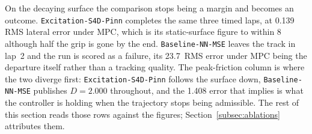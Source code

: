 \documentclass[lineno,12pt]{sn-jnl}
\makeatletter
\newif\ifsiu@prev
\DeclareRobustCommand{\siu@sep}{\ifsiu@prev\,\fi}
\DeclareRobustCommand{\siu@unit}[1]{\siu@sep\text{#1}\siu@prevtrue}
\DeclareRobustCommand{\siu@pre}[1]{\siu@sep\text{#1}\siu@prevfalse}
\DeclareRobustCommand{\siu@div}[1]{\text{#1}\siu@prevfalse}
\DeclareRobustCommand{\meter}{m}
\DeclareRobustCommand{\second}{s}
\DeclareRobustCommand{\gram}{g}
\DeclareRobustCommand{\newton}{N}
\DeclareRobustCommand{\radian}{rad}
\DeclareRobustCommand{\hertz}{Hz}
\DeclareRobustCommand{\percent}{\%}
\DeclareRobustCommand{\g}{\textit{g}}
\DeclareRobustCommand{\kilo}{k}
\DeclareRobustCommand{\milli}{m}
\DeclareRobustCommand{\per}{/}
\DeclareRobustCommand{\squared}{\ensuremath{^{2}}}
\providecommand{\degree}{\ensuremath{^{\circ}}}
\DeclareRobustCommand{\si}[1]{\begingroup
  \siu@prevfalse
  \renewcommand{\meter}{\siu@unit{m}}%
  \renewcommand{\second}{\siu@unit{s}}%
  \renewcommand{\gram}{\siu@unit{g}}%
  \renewcommand{\newton}{\siu@unit{N}}%
  \renewcommand{\radian}{\siu@unit{rad}}%
  \renewcommand{\hertz}{\siu@unit{Hz}}%
  \renewcommand{\percent}{\siu@unit{\%}}%
  \renewcommand{\degree}{\siu@unit{\ensuremath{^{\circ}}}}%
  \renewcommand{\g}{\siu@unit{\textit{g}}}%
  \renewcommand{\kilo}{\siu@pre{k}}%
  \renewcommand{\milli}{\siu@pre{m}}%
  \renewcommand{\per}{\siu@div{/}}%
  \renewcommand{\squared}{\ensuremath{^{2}}}%
  #1\endgroup}
\DeclareRobustCommand{\num}[1]{#1}
\DeclareRobustCommand{\SI}[2]{#1\,\si{#2}}
\newcommand{\oursarm}{\texttt{Excitation-\allowbreak S4D-\allowbreak Pinn}}
\newcommand{\basearm}{\texttt{Baseline-\allowbreak NN-\allowbreak MSE}}
\theoremstyle{thmstyleone}%
\theoremstyle{thmstyletwo}%
\theoremstyle{thmstylethree}%
\makeatother
\begin{document}
On the decaying surface the comparison stops being a margin and becomes an
outcome. \oursarm{} completes the same three timed laps, at
\SI{0.139}{\meter} RMS lateral error under MPC, which is its static-surface
figure to within \SI{8}{\percent} although half the grip is gone by the end.
\basearm{} leaves the track in lap~2 and the run is scored as a failure, its
\SI{23.7}{\meter} RMS error under MPC being the departure itself rather than a
tracking quality. The peak-friction column is where the two diverge first:
\oursarm{} follows the surface down, \basearm{} publishes $D=\num{2.000}$
throughout, and the \num{1.408} error that implies is what the controller is
holding when the trajectory stops being admissible. The rest of this section
reads those rows against the figures; Section~\ref{subsec:ablations} attributes
them.
\end{document}
